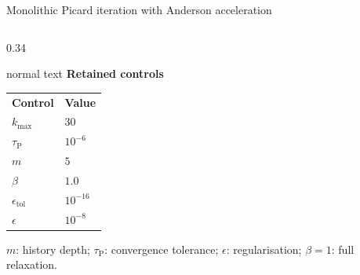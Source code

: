 \documentclass[aspectratio=169,10pt]{beamer}
\begin{document}
\begin{frame}[t]{Monolithic Picard iteration with Anderson acceleration}
\begin{columns}[T,totalwidth=0.94\textwidth]
\begin{column}{0.34\textwidth}
      \begin{beamercolorbox}[wd=\linewidth,sep=0.54em]{normal text}
        \small\textbf{\color{GVCouplingOrange}Retained controls}\par
        \vspace{0.08cm}
        \scriptsize
        \renewcommand{\arraystretch}{1.13}
        \begin{tabular}{@{}ll@{}}
          \rowcolor{GVTealTint}
          \textbf{Control} & \textbf{Value} \\
          \(k_{\max}\) & \(30\) \\
          \(\tau_{\mathrm P}\) & \(10^{-6}\) \\
          \(m\) & \(5\) \\
          \(\beta\) & \(1.0\) \\
          \(\epsilon_{\mathrm{tol}}\) & \(10^{-16}\) \\
          \(\epsilon\) & \(10^{-8}\) \\
        \end{tabular}\par
        \vspace{0.10cm}
        \color{GVSlate}\(m\): history depth; \(\tau_{\mathrm P}\): convergence tolerance; \(\epsilon\): regularisation; \(\beta=1\): full relaxation.
      \end{beamercolorbox}
    \end{column}
  \end{columns}
\end{frame}
\end{document}
